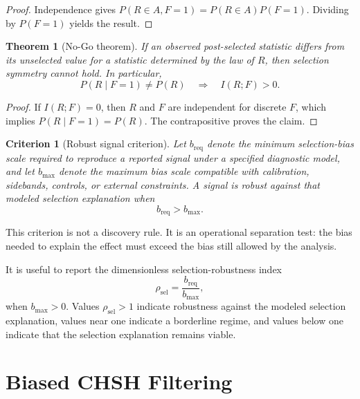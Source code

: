 \documentclass[11pt]{article}
\newtheorem{theorem}{Theorem}
\newtheorem{criterion}{Criterion}
\begin{document}
\begin{proof}
Independence gives \(P(R \in A,F=1)=P(R \in A)P(F=1)\). Dividing by \(P(F=1)\) yields the result.
\end{proof}

\begin{theorem}[No-Go theorem]
If an observed post-selected statistic differs from its unselected value for a statistic determined by the law of \(R\), then selection symmetry cannot hold. In particular,
\begin{equation}
P(R\mid F=1)\neq P(R)
\quad\Longrightarrow\quad
I(R;F)>0.
\end{equation}
\end{theorem}

\begin{proof}
If \(I(R;F)=0\), then \(R\) and \(F\) are independent for discrete \(F\), which implies \(P(R\mid F=1)=P(R)\). The contrapositive proves the claim.
\end{proof}

\begin{criterion}[Robust signal criterion]
Let \(b_{\mathrm{req}}\) denote the minimum selection-bias scale required to reproduce a reported signal under a specified diagnostic model, and let \(b_{\max}\) denote the maximum bias scale compatible with calibration, sidebands, controls, or external constraints. A signal is robust against that modeled selection explanation when
\begin{equation}
b_{\mathrm{req}} > b_{\max}.
\end{equation}
\end{criterion}

This criterion is not a discovery rule. It is an operational separation test: the bias needed to explain the effect must exceed the bias still allowed by the analysis.

It is useful to report the dimensionless selection-robustness index
\begin{equation}
\rho_{\mathrm{sel}}=\frac{b_{\mathrm{req}}}{b_{\max}},
\end{equation}
when \(b_{\max}>0\). Values \(\rho_{\mathrm{sel}}>1\) indicate robustness against the modeled selection explanation, values near one indicate a borderline regime, and values below one indicate that the selection explanation remains viable.

\section{Biased CHSH Filtering}
\end{document}
